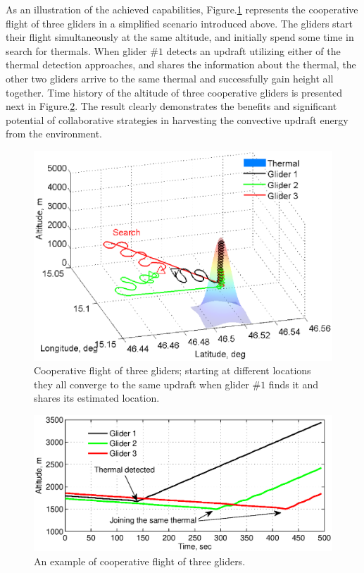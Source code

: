 \documentclass[letterpaper, 10 pt, conference]{ieeeconf}  %
\begin{document}
As an illustration of the achieved capabilities,
Figure.\ref{fig:CoopFlightPaths} represents the cooperative flight of three
gliders in a simplified scenario introduced above. The gliders start their
flight simultaneously at the same altitude, and initially spend some time in
search for thermals. When glider $\#1$ detects an updraft utilizing either of
the thermal detection approaches, and shares the information about the
thermal, the other two gliders arrive to the same thermal and successfully
gain height all together. Time history of the altitude of three cooperative
gliders is presented next in Figure.\ref{fig:CoopFlightHeight}. The result
clearly demonstrates the benefits and significant potential of collaborative
strategies in harvesting the convective updraft energy from the environment.
\begin{figure}[thpb]
  \centering
  \includegraphics[scale=0.41]{Figures/paths_cooperative_flight.eps}
  \caption{Cooperative flight of three gliders; starting at different locations
  they all converge to the same updraft when glider $\#1$ finds it and
  shares its estimated location.}
  \label{fig:CoopFlightPaths}
\end{figure}
\begin{figure}[thpb]
  \centering
  \includegraphics[scale=0.39]{Figures/Coop_gain_altitude.eps}
  \caption{An example of cooperative flight of three gliders.}
  \label{fig:CoopFlightHeight}
\end{figure}
\end{document}
